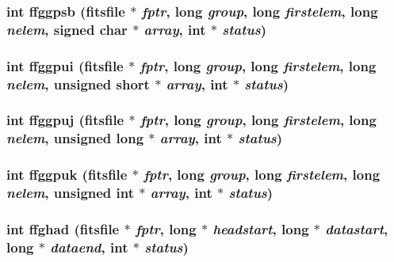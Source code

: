 \subsubsection{\setlength{\rightskip}{0pt plus 5cm}int ffggpsb (\bf{fitsfile} $\ast$ {\em fptr}, long {\em group}, long {\em firstelem}, long {\em nelem}, signed char $\ast$ {\em array}, int $\ast$ {\em status})}\label{test_2roimasker_2fitsio_8h_be4013a55c9a0fc0e0c4bb9708709d9a}


\subsubsection{\setlength{\rightskip}{0pt plus 5cm}int ffggpui (\bf{fitsfile} $\ast$ {\em fptr}, long {\em group}, long {\em firstelem}, long {\em nelem}, unsigned short $\ast$ {\em array}, int $\ast$ {\em status})}\label{test_2roimasker_2fitsio_8h_34d6ece27ce372694fbd813123a5e5be}


\subsubsection{\setlength{\rightskip}{0pt plus 5cm}int ffggpuj (\bf{fitsfile} $\ast$ {\em fptr}, long {\em group}, long {\em firstelem}, long {\em nelem}, unsigned long $\ast$ {\em array}, int $\ast$ {\em status})}\label{test_2roimasker_2fitsio_8h_895a8758518346c4e79ba31731f2a726}


\subsubsection{\setlength{\rightskip}{0pt plus 5cm}int ffggpuk (\bf{fitsfile} $\ast$ {\em fptr}, long {\em group}, long {\em firstelem}, long {\em nelem}, unsigned int $\ast$ {\em array}, int $\ast$ {\em status})}\label{test_2roimasker_2fitsio_8h_2903d7086c8c109b98b9626067b45c11}


\subsubsection{\setlength{\rightskip}{0pt plus 5cm}int ffghad (\bf{fitsfile} $\ast$ {\em fptr}, long $\ast$ {\em headstart}, long $\ast$ {\em datastart}, long $\ast$ {\em dataend}, int $\ast$ {\em status})}\label{test_2roimasker_2fitsio_8h_e1b924d5db7f75a39e445055e1bb12cc}


